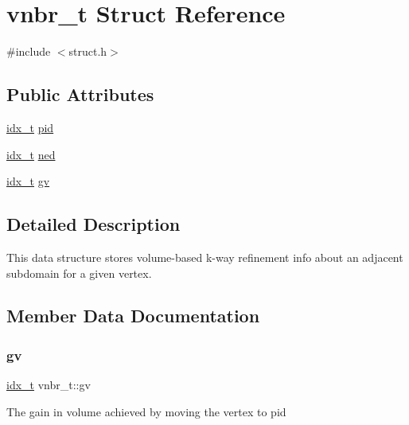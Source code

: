 \hypertarget{structvnbr__t}{}\section{vnbr\+\_\+t Struct Reference}
\label{structvnbr__t}


{\ttfamily \#include $<$struct.\+h$>$}

\subsection*{Public Attributes}
\begin{DoxyCompactItemize}
\item 
\hyperlink{3rd_party_2parmetis-4_80_83_2metis_2include_2metis_8h_aaa5262be3e700770163401acb0150f52}{idx\+\_\+t} \hyperlink{structvnbr__t_a93adf79b4e57cd0477e9afc9b25da653}{pid}
\item 
\hyperlink{3rd_party_2parmetis-4_80_83_2metis_2include_2metis_8h_aaa5262be3e700770163401acb0150f52}{idx\+\_\+t} \hyperlink{structvnbr__t_ae32050bde46f5545e1c306853afd8d97}{ned}
\item 
\hyperlink{3rd_party_2parmetis-4_80_83_2metis_2include_2metis_8h_aaa5262be3e700770163401acb0150f52}{idx\+\_\+t} \hyperlink{structvnbr__t_a29f3fc7f5d884e78e1dfff0f9cc438d0}{gv}
\end{DoxyCompactItemize}


\subsection{Detailed Description}
This data structure stores volume-\/based k-\/way refinement info about an adjacent subdomain for a given vertex. 

\subsection{Member Data Documentation}
\mbox{\label{structvnbr__t_a29f3fc7f5d884e78e1dfff0f9cc438d0}} 
\subsubsection{\texorpdfstring{gv}{gv}}
{\footnotesize\ttfamily \hyperlink{3rd_party_2parmetis-4_80_83_2metis_2include_2metis_8h_aaa5262be3e700770163401acb0150f52}{idx\+\_\+t} vnbr\+\_\+t\+::gv}

The gain in volume achieved by moving the vertex to pid \mbox{\label{structvnbr__t_ae32050bde46f5545e1c306853afd8d97}} 
